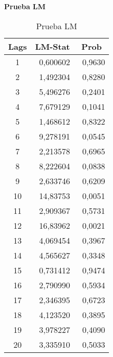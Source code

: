 \begin{enumerate}
\textbf{Prueba LM}
%

\begin{table}[H]
\centering
\begin{tabular}{ccc}\hline\hline
Lags & LM-Stat & Prob \\ \hline\hline
1 & ~0,600602 & ~0,9630 \\
2 & ~1,492304 & ~0,8280 \\
3 & ~5,496276 & ~0,2401 \\
4 & ~7,679129 & ~0,1041 \\
5 & ~1,468612 & ~0,8322 \\
6 & ~9,278191 & ~0,0545 \\
7 & ~2,213578 & ~0,6965 \\
8 & ~8,222604 & ~0,0838 \\
9 & ~2,633746 & ~0,6209 \\
10& ~14,83753 & ~0,0051 \\
11& ~2,909367 & ~0,5731 \\
12& ~16,83962 & ~0,0021 \\
13& ~4,069454 & ~0,3967 \\
14& ~4,565627 & ~0,3348 \\
15& ~0,731412 & ~0,9474 \\
16& ~2,790990 & ~0,5934 \\
17& ~2,346395 & ~0,6723 \\
18& ~4,123520 & ~0,3895 \\
19& ~3,978227 & ~0,4090 \\
20& ~3,335910 & ~0,5033 \\\hline\hline
\end{tabular}
\caption{Prueba LM}
\label{tab38}
\end{table}


\end{enumerate}
